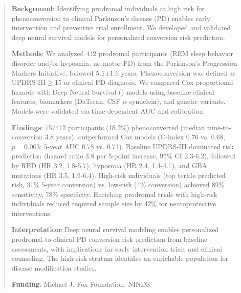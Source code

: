 \begin{abstract}
\textbf{Background}: Identifying prodromal individuals at high risk for phenoconversion to clinical Parkinson's disease (PD) enables early intervention and preventive trial enrollment. We developed and validated deep neural survival models for personalized conversion risk prediction.

\textbf{Methods}: We analyzed 412 prodromal participants (REM sleep behavior disorder and/or hyposmia, no motor PD) from the Parkinson's Progression Markers Initiative, followed 5.1$\pm$1.6 years. Phenoconversion was defined as UPDRS-III$\geq$15 or clinical PD diagnosis. We compared Cox proportional hazards with Deep Neural Survival (\deepsurv) models using baseline clinical features, biomarkers (DaTscan, CSF $\alpha$-synuclein), and genetic variants. Models were validated via time-dependent AUC and calibration.

\textbf{Findings}: 75/412 participants (18.2\%) phenoconverted (median time-to-conversion 3.8 years). \deepsurv{} outperformed Cox models (C-index 0.76 vs. 0.68, $p=0.003$; 5-year AUC 0.78 vs. 0.71). Baseline UPDRS-III dominated risk prediction (hazard ratio 3.8 per 5-point increase, 95\% CI 2.3-6.2), followed by RBD (HR 3.2, 1.8-5.7), hyposmia (HR 2.4, 1.4-4.1), and GBA mutations (HR 3.5, 1.9-6.4). High-risk individuals (top tertile predicted risk, 31\% 5-year conversion) vs. low-risk (4\% conversion) achieved 89\% sensitivity, 78\% specificity. Enriching prodromal trials with high-risk individuals reduced required sample size by 42\% for neuroprotective interventions.

\textbf{Interpretation}: Deep neural survival modeling enables personalized prodromal-to-clinical PD conversion risk prediction from baseline assessments, with implications for early intervention trials and clinical counseling. The high-risk stratum identifies an enrichable population for disease modification studies.

\textbf{Funding}: Michael J. Fox Foundation, NINDS.
\end{abstract}
